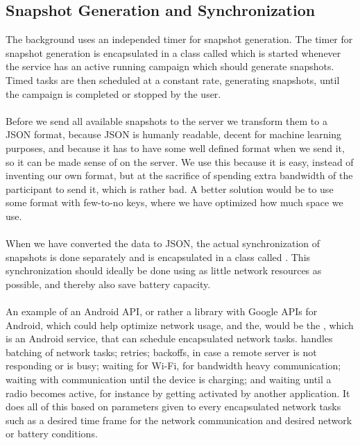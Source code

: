 \subsection{Snapshot Generation and Synchronization}
\label{sub:background_sensor_service_snapshot_generation_and_synchronization}

The background  uses an independed timer for snapshot generation. The timer for snapshot generation is encapsulated in a class called  which is started whenever the service has an active running campaign which should generate snapshots. Timed tasks are then scheduled at a constant rate, generating snapshots, until the campaign is completed or stopped by the user.
\\\\
Before we send all available snapshots to the server we transform them to a JSON format, because JSON is humanly readable, decent for machine learning purposes, and because it has to have some well defined format when we send it, so it can be made sense of on the server. We use this because it is easy, instead of inventing our own format, but at the sacrifice of spending extra bandwidth of the participant to send it, which is rather bad. A better solution would be to use some format with few-to-no keys, where we have optimized how much space we use. 
\\\\
When we have converted the data to JSON, the actual synchronization of snapshots is done separately and is encapsulated in a class called . This synchronization should ideally be done using as little network resources as possible, and thereby also save battery capacity. 
\\\\
An example of an Android API, or rather a library with Google APIs for Android, which could help optimize network usage, and the, would be the , which is an Android service, that can schedule encapsulated network tasks.  \parencite{gcmnetworkmanager} handles batching of network tasks; retries; backoffs, in case a remote server is not responding or is busy; waiting for Wi-Fi, for bandwidth heavy communication; waiting with communication until the device is charging; and waiting until a radio becomes active, for instance by getting activated by another application. It does all of this based on parameters given to every encapsulated network tasks such as a desired time frame for the network communication and desired network or battery conditions.  
